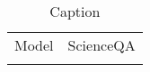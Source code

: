 \begin{table}[]
    \centering
    \begin{tabular}{c|c}
        Model &  ScienceQA  \\
         &  \\ 
         
    \end{tabular}
    \caption{Caption}
    \label{tab:my_label}
\end{table}